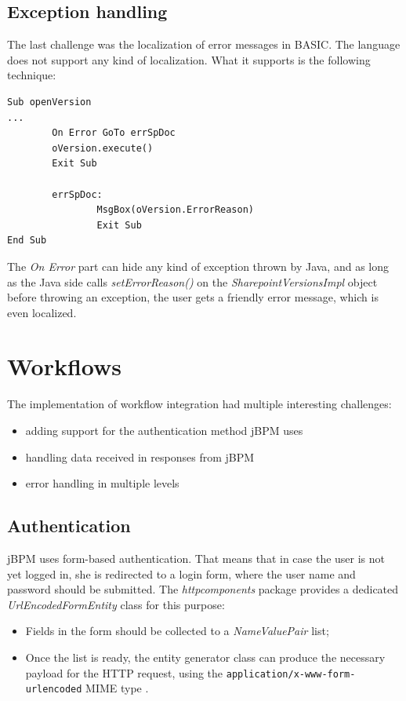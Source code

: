 \subsection{Exception handling}

The last challenge was the localization of error messages in BASIC. The
language does not support any kind of localization. What it supports is the
following technique:

\begin{lstlisting}
Sub openVersion
...
        On Error GoTo errSpDoc
        oVersion.execute()
        Exit Sub

        errSpDoc:
                MsgBox(oVersion.ErrorReason)
                Exit Sub
End Sub
\end{lstlisting}

The \emph{On Error} part can hide any kind of exception thrown by Java, and as
long as the Java side calls \emph{setErrorReason()} on the
\emph{SharepointVersionsImpl} object before throwing an exception, the user gets
a friendly error message, which is even localized.

\section{Workflows}

The implementation of workflow integration had multiple interesting challenges:

\begin{itemize}
\item adding support for the authentication method jBPM uses
\item handling data received in responses from jBPM
\item error handling in multiple levels
\end{itemize}

\subsection{Authentication}

jBPM uses form-based authentication. That means that in case the user is not
yet logged in, she is redirected to a login form, where the user name and
password should be submitted. The \emph{httpcomponents} package provides a
dedicated \emph{UrlEncodedFormEntity} class for this purpose:

\begin{itemize}
\item Fields in the form should be collected to a \emph{NameValuePair} list;
\item Once the list is ready, the entity generator class can produce the
necessary payload for the HTTP request, using the
\texttt{application/x-www-form-urlencoded} MIME type \cite{form-encoding}.
\end{itemize}

